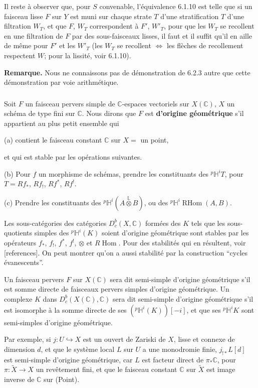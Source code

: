 \documentclass[12pt,a4paper]{article}
\theoremstyle{plain}
\theoremstyle{definition}
\theoremstyle{remark}
\DeclareMathOperator{\Hom}{Hom}
\DeclareMathOperator{\RHom}{RHom}
\newcommand{\CC}{\mathbb{C}}
\newcommand{\HH}{\mathbb{H}}
\newcommand{\LL}{\mathbb{L}}
\begin{document}
Il reste \`a observer que, pour $S$ convenable, l'\'equivalence 6.1.10 est telle que si un faisceau lisse $F$ sur $Y$ est muni sur chaque strate $T$ d'une stratification $T$ d'une filtration $W_T$, et que $F$, $W_T$ correspondent \`a $F'$, $W'_T$, pour que les $W_T$ se recollent en une filtration de $F$ par des sous-faisceaux lisses, il faut et il suffit qu'il en aille de m\^eme pour $F'$ et les $W'_T$ (les $W_T$ se recollent $\Leftrightarrow$ les fl\`eches de recollement respectent $W$; pour la lissit\'e, voir 6.1.10).

\medskip
\noindent\textbf{Remarque.} Nous ne connaissons pas de d\'emonstration de 6.2.3 autre que cette d\'emonstration par voie arithm\'etique.

\subsubsection{}
Soit $F$ un faisceau pervers simple de $\CC$-espaces vectoriels sur $X(\CC)$, $X$ un sch\'ema de type fini sur $\CC$. Nous dirons que $F$ est \textbf{d'origine g\'eom\'etrique} s'il appartient au plus petit ensemble qui

(a) contient le faisceau constant $\CC$ sur $X =$ un point,

et qui est stable par les op\'erations suivantes.

(b) Pour $f$ un morphisme de sch\'emas, prendre les constituants des ${}^{p}\HH^iT$, pour $T = Rf_*$, $Rf_!$, $Rf^*$, $Rf^!$.

(c) Prendre les constituants des ${}^{p}\HH^i(A \overset{\LL}{\otimes} B)$, ou des ${}^{p}\HH^i\RHom(A, B)$.

Les sous-cat\'egories des cat\'egories $D^b_c(X, \CC)$ form\'ees des $K$ tels que les sous-quotients simples des ${}^{p}\HH^i(K)$ soient d'origine g\'eom\'etrique sont stables par les op\'erateurs $f_*$, $f_!$, $f^*$, $f^!$, $\otimes$ et $R\Hom$. Pour des stabilit\'es qui en r\'esultent, voir [references]. On peut montrer qu'on a aussi stabilit\'e par la construction ``cycles \'evanescents''.

Un faisceau pervers $F$ sur $X(\CC)$ sera dit semi-simple d'origine g\'eom\'etrique s'il est somme directe de faisceaux pervers simples d'origine g\'eom\'etrique. Un complexe $K$ dans $D^b_c(X(\CC), \CC)$ sera dit semi-simple d'origine g\'eom\'etrique s'il est isomorphe \`a la somme directe de ses $({}^{p}\HH^i(K))[-i]$, et que ses ${}^{p}\HH^iK$ sont semi-simples d'origine g\'eom\'etrique.

Par exemple, si $j: U \hookrightarrow X$ est un ouvert de Zariski de $X$, lisse et connexe de dimension $d$, et que le syst\`eme local $L$ sur $U$ a une monodromie finie, $j_{!*}L[d]$ est semi-simple d'origine g\'eom\'etrique, car $L$ est facteur direct de $\pi_*\CC$, pour $\pi: \tilde{X} \to X$ un rev\^etement fini, et que le faisceau constant $\CC$ sur $\tilde{X}$ est image inverse de $\CC$ sur (Point).
\end{document}
